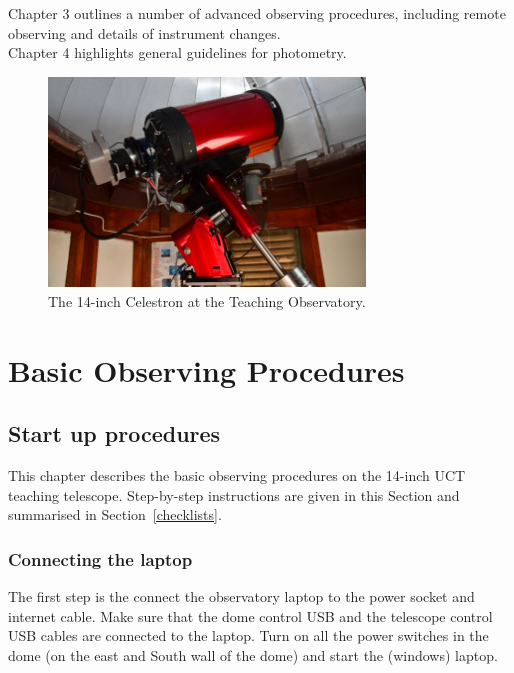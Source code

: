 \documentclass[12pt,twoside,a4paper]{report}
\begin{document}
Chapter 3 outlines a number of advanced observing procedures, including remote observing and details of 
instrument changes.\\

Chapter 4 highlights general guidelines for photometry.\\

\begin{figure}[h]
 \centering
    \includegraphics[width=0.75\textwidth]{documentation_images/telescope.jpg}
    \caption{\label{fig:telescope} The 14-inch Celestron at the Teaching Observatory.}
\end{figure}

\vfill \eject

\chapter{Basic Observing Procedures}

\section{Start up procedures}

This chapter describes the basic observing procedures on the 14-inch UCT teaching telescope. 
Step-by-step instructions are given in this Section and
summarised in Section~\ref{checklists}.

\subsection{Connecting the laptop}

The first step is the connect the observatory laptop to the power socket and internet cable. Make
sure that the dome control USB and the telescope control USB cables are connected to the laptop.
Turn on all the power switches in the dome (on the east and South wall of the dome) and start the
(windows) laptop.
\end{document}
